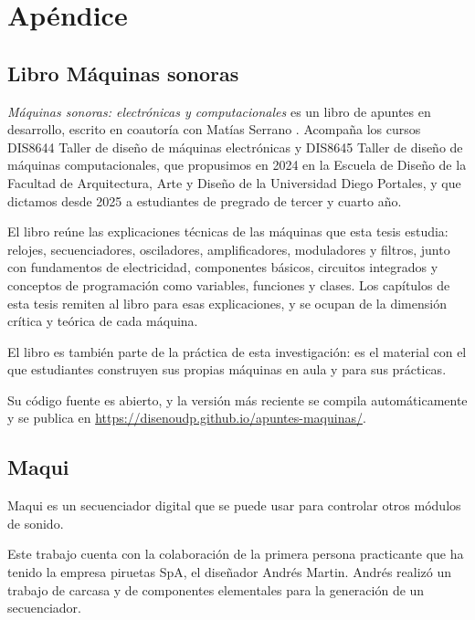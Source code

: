 \documentclass[../candidatura.tex]{subfiles}
\begin{document}
\section{Apéndice}


\subsection{Libro Máquinas sonoras}

\textit{Máquinas sonoras: electrónicas y computacionales} es un libro de apuntes en desarrollo, escrito en coautoría con Matías Serrano \parencite{montoyamoraga_maquinas_2026}. Acompaña los cursos DIS8644 Taller de diseño de máquinas electrónicas y DIS8645 Taller de diseño de máquinas computacionales, que propusimos en 2024 en la Escuela de Diseño de la Facultad de Arquitectura, Arte y Diseño de la Universidad Diego Portales, y que dictamos desde 2025 a estudiantes de pregrado de tercer y cuarto año.

El libro reúne las explicaciones técnicas de las máquinas que esta tesis estudia: relojes, secuenciadores, osciladores, amplificadores, moduladores y filtros, junto con fundamentos de electricidad, componentes básicos, circuitos integrados y conceptos de programación como variables, funciones y clases. Los capítulos de esta tesis remiten al libro para esas explicaciones, y se ocupan de la dimensión crítica y teórica de cada máquina.

El libro es también parte de la práctica de esta investigación: es el material con el que estudiantes construyen sus propias máquinas en aula y para sus prácticas.

Su código fuente es abierto, y la versión más reciente se compila automáticamente y se publica en \url{https://disenoudp.github.io/apuntes-maquinas/}.


\subsection{Maqui}

Maqui es un secuenciador digital que se puede usar para controlar otros módulos de sonido.

Este trabajo cuenta con la colaboración de la primera persona practicante que ha tenido la empresa piruetas SpA, el diseñador Andrés Martin. Andrés realizó un trabajo de carcasa y de componentes elementales para la generación de un secuenciador.
\end{document}
